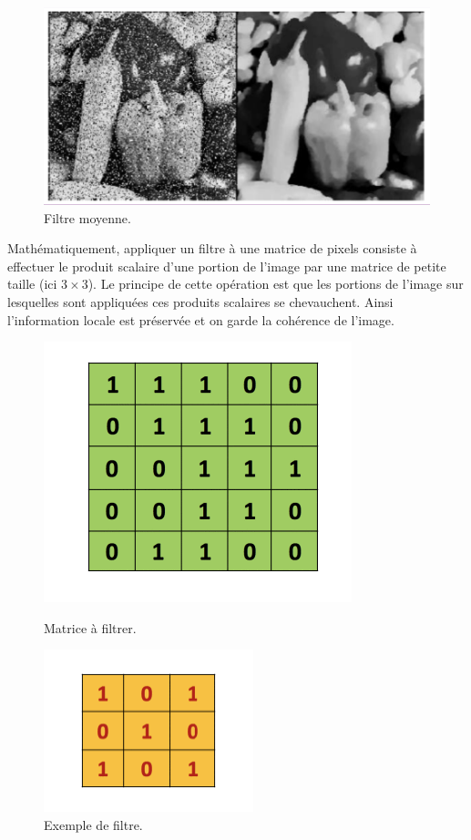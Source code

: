 \begin{figure}[h]
  \centering
  \includegraphics[scale=0.3]{assets/filtre-moyenne}
  \caption{Filtre moyenne.}
  \label{fig:filtre_moyenne}
\end{figure}

Mathématiquement, appliquer un filtre à une matrice de pixels  consiste à effectuer le 
produit scalaire d'une portion de l'image par une matrice de petite taille (ici 
$3 \times 3$). Le principe de cette opération est que les portions de l'image sur 
lesquelles sont appliquées ces produits scalaires se chevauchent. Ainsi l'information 
locale est préservée et on garde la cohérence de l'image.

\begin{figure}[h]
  \centering
  \includegraphics[scale=0.5]{assets/matrice-pixels}
  \caption{Matrice à filtrer.}
  \includegraphics[scale=0.5]{assets/filtre}
  \caption{Exemple de filtre.}
  \label{fig:filtre}
\end{figure}

